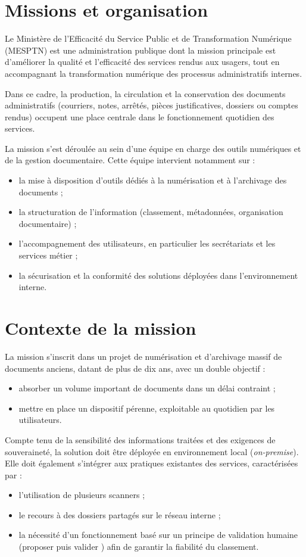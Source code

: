 \documentclass[12pt,a4paper]{report}
\newcommand{\nomMinistere}{Ministère de l'Efficacité du Service Public et de Transformation Numérique (MESPTN)}
\begin{document}
\section{Missions et organisation}
Le \nomMinistere{} est une administration publique dont la mission principale est d’améliorer la qualité et l’efficacité des services rendus aux usagers, tout en accompagnant la transformation numérique des processus administratifs internes.

Dans ce cadre, la production, la circulation et la conservation des documents administratifs (courriers, notes, arrêtés, pièces justificatives, dossiers ou comptes rendus) occupent une place centrale dans le fonctionnement quotidien des services.

La mission s’est déroulée au sein d’une équipe en charge des outils numériques et de la gestion documentaire. Cette équipe intervient notamment sur :
\begin{itemize}
  \item la mise à disposition d’outils dédiés à la numérisation et à l’archivage des documents ;
  \item la structuration de l’information (classement, métadonnées, organisation documentaire) ;
  \item l’accompagnement des utilisateurs, en particulier les secrétariats et les services métier ;
  \item la sécurisation et la conformité des solutions déployées dans l’environnement interne.
\end{itemize}

\section{Contexte de la mission}
La mission s’inscrit dans un projet de numérisation et d’archivage massif de documents anciens, datant de plus de dix ans, avec un double objectif :
\begin{itemize}
  \item absorber un volume important de documents dans un délai contraint ;
  \item mettre en place un dispositif pérenne, exploitable au quotidien par les utilisateurs.
\end{itemize}

Compte tenu de la sensibilité des informations traitées et des exigences de souveraineté, la solution doit être déployée en environnement local (\textit{on-premise}). Elle doit également s’intégrer aux pratiques existantes des services, caractérisées par :
\begin{itemize}
  \item l’utilisation de plusieurs scanners ;
  \item le recours à des dossiers partagés sur le réseau interne ;
  \item la nécessité d’un fonctionnement basé sur un principe de validation humaine (\og proposer puis valider \fg{}) afin de garantir la fiabilité du classement.
\end{itemize}
\end{document}
